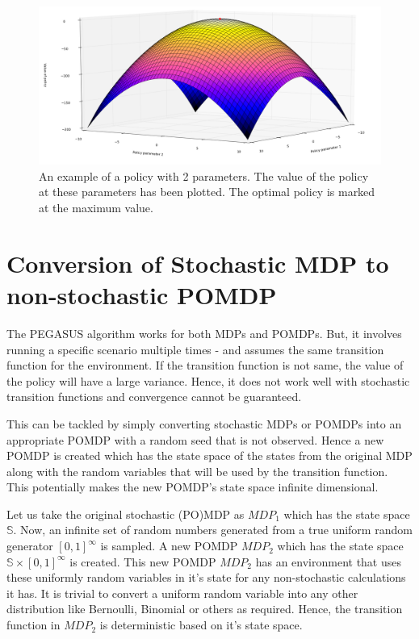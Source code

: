\documentclass[hidelinks,BTech]{iitmdiss}
\begin{document}
\begin{figure}[H]
  \centering
    \includegraphics[width=\textwidth]{gradient_descent.png}
    \caption{An example of a policy with 2 parameters. The value of the policy at these parameters has been plotted. The optimal policy is marked at the maximum value.}
\end{figure}

\section{Conversion of Stochastic MDP to non-stochastic POMDP}

The PEGASUS algorithm works for both MDPs and POMDPs. But, it involves running a specific scenario multiple times - and assumes the same transition function for the environment. If the transition function is not same, the value of the policy will have a large variance. Hence, it does not work well with stochastic transition functions and convergence cannot be guaranteed.

This can be tackled by simply converting stochastic MDPs or POMDPs into an appropriate POMDP with a random seed that is not observed. Hence a new POMDP is created which has the state space of the states from the original MDP along with the random variables that will be used by the transition function. This potentially makes the new POMDP's state space infinite dimensional.

Let us take the original stochastic (PO)MDP as $MDP_{1}$ which has the state space $\mathbb{S}$. Now, an infinite set of random numbers generated from a true uniform random generator $[0,1]^{\infty}$ is sampled. A new POMDP $MDP_{2}$ which has the state space $\mathbb{S} \times [0,1]^{\infty}$ is created. This new POMDP $MDP_{2}$ has an environment that uses these uniformly random variables in it's state for any non-stochastic calculations it has. It is trivial to convert a uniform random variable into any other distribution like Bernoulli, Binomial or others as required. Hence, the transition function in $MDP_{2}$ is deterministic based on it's state space.
\end{document}
